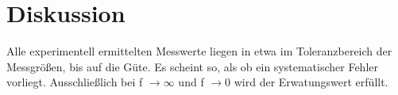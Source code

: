 \section{Diskussion}
\label{sec:Diskussion}
Alle experimentell ermittelten Messwerte liegen in etwa im Toleranzbereich der Messgrößen, bis auf die Güte. Es scheint so, als ob ein systematischer Fehler vorliegt. Ausschließlich bei f $\rightarrow \infty $ und f $\rightarrow 0$ wird der Erwatungswert erfüllt.
